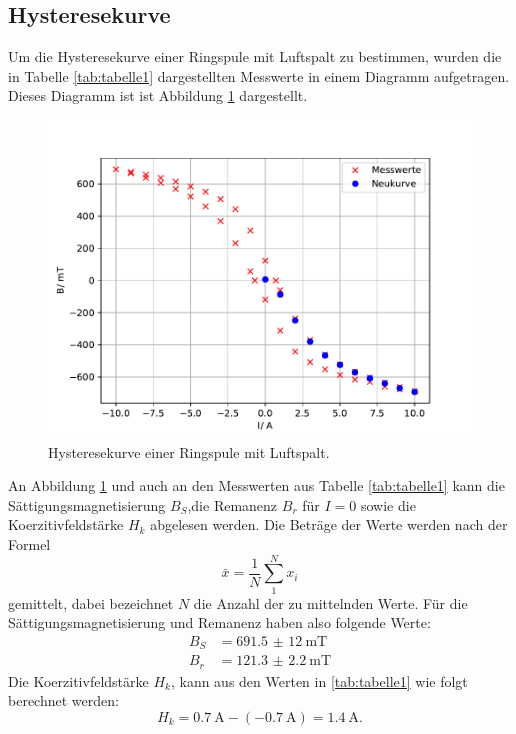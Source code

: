 \subsection{Hysteresekurve}
\noindent Um die Hysteresekurve einer Ringspule mit
Luftspalt zu bestimmen, wurden die in Tabelle
\ref{tab:tabelle1} dargestellten Messwerte in einem
Diagramm aufgetragen. Dieses Diagramm ist ist Abbildung
\ref{fig:plothys} dargestellt.

\begin{figure}
  \centering
  \includegraphics{plothys.pdf}
  \caption{Hysteresekurve einer Ringspule mit Luftspalt.}
  \label{fig:plothys}
\end{figure}
\noindent An Abbildung \ref{fig:plothys} und auch an den
Messwerten
aus Tabelle \ref{tab:tabelle1} kann die
Sättigungsmagnetisierung $B_{S}$,die Remanenz
$B_{r}$ für $I=0$ sowie die Koerzitivfeldstärke
$H_{k}$ abgelesen werden.
Die Beträge der Werte werden nach der Formel
\begin{equation}
  \bar{x}=\frac{1}{N}\sum_{1}^N x_{i}
  \label{eqn:mittel}
\end{equation}
gemittelt, dabei bezeichnet $N$ die Anzahl der zu
mittelnden Werte.
Für die Sättigungsmagnetisierung und
Remanenz haben also folgende Werte:
\begin{align*}
  B_{S} &=\SI{691,5(12)}{\milli\tesla} \\
  B_{r} &=\SI{121.3(22)}{\milli\tesla}
\end{align*}
Die Koerzitivfeldstärke $H_{k}$, kann aus den Werten in
\ref{tab:tabelle1} wie folgt berechnet werden:
\begin{equation}
  H_{k}=\SI{0,7}{\ampere}-(\SI{-0,7}{\ampere})=\SI{1,4}{\ampere}.
  \label{eqn:koerzitiv}
\end{equation}


